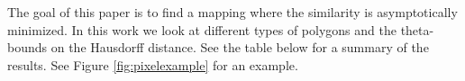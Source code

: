 \documentclass[a4paper,UKenglish,cleveref]{lipics-v2019}
\newcommand{\mremark}[3]{\textcolor{blue}{\textsc{#1 #2:}} \textcolor{SeaGreen}{\textsf{#3}}}
\newcommand{\jerome}[2][says]{\mremark{J\'er\^ome}{#1}{#2}}
\newcommand{\eps}{\varepsilon}
\begin{document}

The goal of this paper is to find a mapping where the similarity is asymptotically minimized. In this work we look at different types of polygons and the theta-bounds on the Hausdorff distance. See the table below for a summary of the results.
See Figure \ref{fig:pixelexample} for an example.






\end{document}
